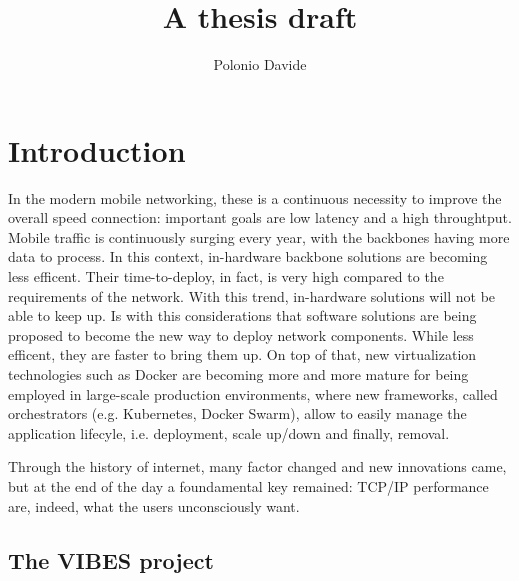 \documentclass[10pt]{book}
\author{Polonio Davide}
\title{A thesis draft}
\begin{document}
 \maketitle
 

 
 \chapter{Introduction}
 
 In the modern mobile networking, these is a continuous necessity to 
improve the overall speed connection: important goals are low latency and a 
high throughtput. Mobile traffic is continuously surging every year, with 
the backbones having more data to process. In this context, in-hardware 
backbone solutions are becoming less efficent. Their time-to-deploy, in fact, is 
very high compared to the requirements of the network. With this trend, 
in-hardware solutions will not be able to keep up. Is with this considerations 
that software solutions are being proposed to become the new way to deploy 
network components. While less efficent, they are faster to bring them up. On 
top of that, new virtualization technologies such as Docker are becoming more 
and more mature for being employed in large-scale production environments,
where new frameworks, called orchestrators (e.g. Kubernetes, Docker Swarm),
allow to easily manage the application lifecyle, i.e. deployment, scale up/down
and finally, removal.

 Through the history of internet, many factor changed and new innovations came,
but at the end of the day a foundamental key remained: TCP/IP performance are, 
indeed, what the users unconsciously want.
 
 \section{The VIBES project}
\end{document}
